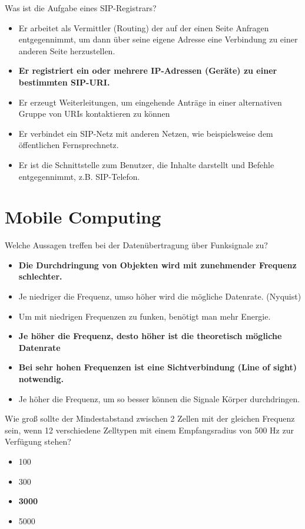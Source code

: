 \documentclass{article}
\begin{document}
	Was ist die Aufgabe eines SIP-Registrars?
	\begin{itemize}
		\item Er arbeitet als Vermittler (Routing) der auf der einen Seite Anfragen entgegennimmt, um dann über seine eigene Adresse eine Verbindung zu einer anderen Seite herzustellen. 
		\item \textbf{Er registriert ein oder mehrere IP-Adressen (Geräte) zu einer bestimmten SIP-URI. }
		\item Er erzeugt Weiterleitungen, um eingehende Anträge in einer alternativen Gruppe von URIs kontaktieren zu können 
		\item Er verbindet ein SIP-Netz mit anderen Netzen, wie beispielsweise dem öffentlichen Fernsprechnetz.
		\item Er ist die Schnittstelle zum Benutzer, die Inhalte darstellt und Befehle entgegennimmt, z.B. SIP-Telefon. 
	\end{itemize}
	
	\section{Mobile Computing}
	
	Welche Aussagen treffen bei der Datenübertragung über Funksignale zu?
	\begin{itemize}
		\item \textbf{Die Durchdringung von Objekten wird mit zunehmender Frequenz schlechter.}
		\item Je niedriger die Frequenz, umso höher wird die mögliche Datenrate. (Nyquist)
		\item Um mit niedrigen Frequenzen zu funken, benötigt man mehr Energie.
		\item \textbf{Je höher die Frequenz, desto höher ist die theoretisch mögliche Datenrate}
		\item  \textbf{Bei sehr hohen Frequenzen ist eine Sichtverbindung (Line of sight) notwendig.}
		\item Je höher die Frequenz, um so besser können die Signale Körper durchdringen.
	\end{itemize}

	Wie groß sollte der Mindestabstand zwischen 2 Zellen mit der gleichen Frequenz sein, wenn 12 verschiedene Zelltypen mit einem Empfangsradius von 500 Hz zur Verfügung stehen?
	\begin{itemize}
		\item 100
		\item 300
		\item \textbf{3000}
		\item 5000
	\end{itemize}
\end{document}
